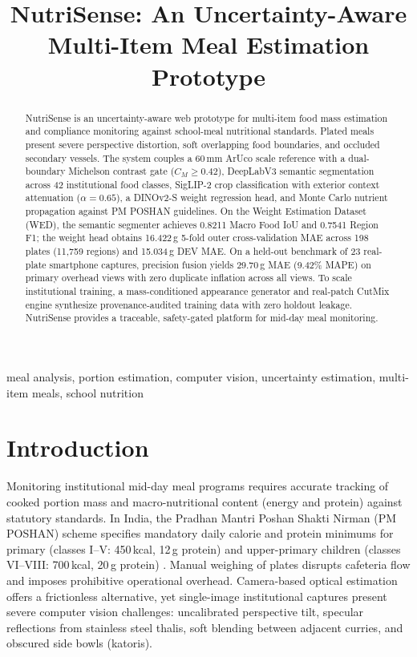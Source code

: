 \documentclass[conference]{IEEEtran}
\title{NutriSense: An Uncertainty-Aware Multi-Item Meal Estimation Prototype}
\author{%
\IEEEauthorblockN{SS Gokula Swamy, Somanath S.D, Roshanth V, Aryan Kumar}
\IEEEauthorblockA{\textit{BMS College of Engineering}\\Bengaluru, India}}
\begin{document}
\maketitle

\begin{abstract}
NutriSense is an uncertainty-aware web prototype for multi-item food mass estimation and compliance monitoring against school-meal nutritional standards. Plated meals present severe perspective distortion, soft overlapping food boundaries, and occluded secondary vessels. The system couples a 60\,mm ArUco scale reference with a dual-boundary Michelson contrast gate ($C_M \ge 0.42$), DeepLabV3 semantic segmentation across 42 institutional food classes, SigLIP-2 crop classification with exterior context attenuation ($\alpha = 0.65$), a DINOv2-S weight regression head, and Monte Carlo nutrient propagation against PM POSHAN guidelines. On the Weight Estimation Dataset (WED), the semantic segmenter achieves 0.8211 Macro Food IoU and 0.7541 Region F1; the weight head obtains 16.422\,g 5-fold outer cross-validation MAE across 198 plates (11,759 regions) and 15.034\,g DEV MAE. On a held-out benchmark of 23 real-plate smartphone captures, precision fusion yields 29.70\,g MAE (9.42\% MAPE) on primary overhead views with zero duplicate inflation across all views. To scale institutional training, a mass-conditioned appearance generator and real-patch CutMix engine synthesize provenance-audited training data with zero holdout leakage. NutriSense provides a traceable, safety-gated platform for mid-day meal monitoring.
\end{abstract}

\begin{IEEEkeywords}
meal analysis, portion estimation, computer vision, uncertainty estimation, multi-item meals, school nutrition
\end{IEEEkeywords}

\section{Introduction}
Monitoring institutional mid-day meal programs requires accurate tracking of cooked portion mass and macro-nutritional content (energy and protein) against statutory standards. In India, the Pradhan Mantri Poshan Shakti Nirman (PM POSHAN) scheme specifies mandatory daily calorie and protein minimums for primary (classes I--V: 450\,kcal, 12\,g protein) and upper-primary children (classes VI--VIII: 700\,kcal, 20\,g protein) \cite{pmposhan2022guidelines}. Manual weighing of plates disrupts cafeteria flow and imposes prohibitive operational overhead. Camera-based optical estimation offers a frictionless alternative, yet single-image institutional captures present severe computer vision challenges: uncalibrated perspective tilt, specular reflections from stainless steel thalis, soft blending between adjacent curries, and obscured side bowls (katoris).
\end{document}
